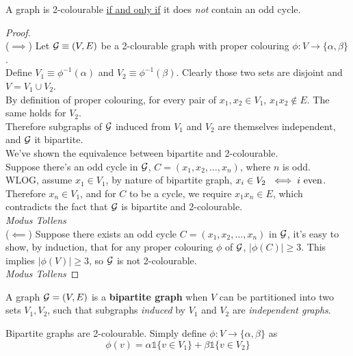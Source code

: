 \documentclass{article}
\begin{document}
			\begin{theorem}
				A graph is 2-colourable \ul{if and only if} it does \emph{not} contain an odd cycle.
				\begin{proof}\quad \\
					($\implies$) Let $\mathcal{{G}} \equiv (V, E)$ be a 2-clourable graph with proper colouring $\phi: V \to \{\alpha, \beta\}$. \\
					Define $V_1 \equiv \phi^{-1}(\alpha)$ and $V_2 \equiv \phi^{-1}(\beta)$. Clearly those two sets are disjoint and $V = V_1 \cup V_2$. \\
					By definition of proper colouring, for every pair of $x_1, x_2 \in V_1$, $x_1 x_2 \notin E$. The same holds for $V_2$. \\
					Therefore subgraphs of $\mathcal{{G}}$ induced from $V_1$ and $V_2$ are themselves independent, and $\mathcal{{G}}$ it bipartite. \\
					We've shown the equivalence between bipartite and 2-colourable. \\
					Suppose there's an odd cycle in $\mathcal{{G}}$, $C = (x_1, x_2, \dots, x_n)$, where $n$ is odd. \\
					WLOG, assume $x_1 \in V_1$, by nature of bipartite graph, $x_i \in V_2\ \iff i \tx{ even}$. Therefore $x_n \in V_1$, and for $C$ to be a cycle, we require $x_1 x_n \in E$, which contradicts the fact that $\mathcal{{G}}$ is bipartite and 2-colourable. \\\emph{Modus Tollens} \\
					($\impliedby$) Suppose there exists an odd cycle $C = (x_1, x_2, \dots, x_n)$ in $\mathcal{{G}}$, it's easy to show, by induction,  that for any proper colouring $\phi$ of $\mathcal{{G}}$, $|\phi(C)| \geq 3$. This implies $|\phi(V)| \geq 3$, so $\mathcal{{G}}$ is not 2-colourable. \\
					\emph{Modus Tollens}
				\end{proof}
			\end{theorem}
			
			\begin{definition}
				A graph $\mathcal{{G}} = (V, E)$ is a \textbf{bipartite graph} when $V$ can be partitioned into two sets $V_1, V_2$, such that subgraphs \emph{induced} by $V_1$ and $V_2$ are \emph{independent graphs}.
			\end{definition}
			
			\begin{remark}
				Bipartite graphs are 2-colourable. Simply define $\phi: V \to \{\alpha, \beta\}$ as 
				\begin{equation}
					\phi(v) = \alpha \mathds{1}\{v \in V_1\} + \beta \mathds{1}\{v \in V_2\}
				\end{equation}
			\end{remark}
			
\end{document}

